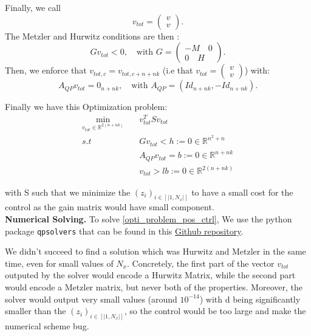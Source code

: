 \documentclass[12pt]{article}
\begin{document}
Finally, we call $$v_{tot} = \begin{pmatrix}v\\v\end{pmatrix}.$$
The Metzler and Hurwitz conditions are then : $$Gv_{tot} <0, \quad \text{with }G = \begin{pmatrix}-M\quad 0 \\ 0 \quad H\end{pmatrix}.$$Then, we enforce that $v_{tot, c} = v_{tot, c+n+nk}$ (i.e that $v_{tot} = \begin{pmatrix}v\\v\end{pmatrix}$) with: $$A_{QP}v_{tot} = 0_{n+nk},\quad \text{with } A_{QP}= (Id_{n+nk},-Id_{n+nk}).$$


Finally we have this Optimization problem: 
\begin{equation}\label{opti_problem_pos_ctrl}
\begin{aligned}
\min_{v_{tot}\in \mathbb{R}^{2(n+nk)}}\quad &v_{tot}^TSv_{tot}\\
s.t \quad &Gv_{tot} <h:=0\in\mathbb{R}^{n^2+n} \\
&A_{QP}v_{tot}= b:=0 \in \mathbb{R}^{n+nk}\\
&v_{tot} > lb:=0 \in \mathbb{R}^{2(n+nk)}
\end{aligned}    
\end{equation}

with S such that we minimize the $(z_i)_{i\in[|1,N_x|]}$ to have a small cost for the control as the gain matrix would have small component.\\


\textbf{Numerical Solving.} To solve \eqref{opti_problem_pos_ctrl}, We use the python package \texttt{qpsolvers} that can be found in this \href{https://github.com/qpsolvers/qpsolvers}{Github repository}. 

We didn't succeed to find a solution which was Hurwitz and Metzler in the same time, even for small values of $N_x$. Concretely, the first part of the vector $v_{tot}$  outputed by the solver would encode a Hurwitz Matrix, while the second part would encode a Metzler matrix, but never both of the properties. Moreover, the solver would output very small values (around $10^{-14}$) with d being significantly smaller than the $(z_i)_{i\in[|1,N_x|]}$, so the control would be too large and make the numerical scheme bug. 




\newpage
\appendix
\end{document}
